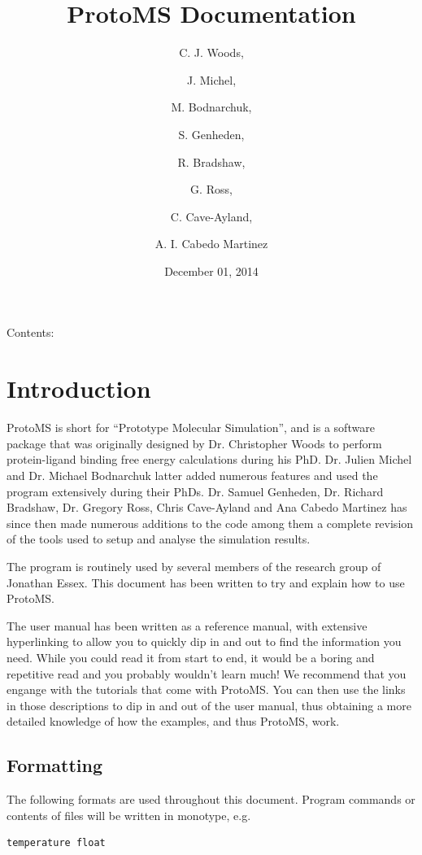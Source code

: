 \documentclass[letterpaper,10pt,english]{sphinxmanual}
\title{ProtoMS Documentation}
\date{December 01, 2014}
\author{C. J. Woods, \and J. Michel, \and M. Bodnarchuk, \and S. Genheden, \and R. Bradshaw, \and G. Ross, \and C. Cave-Ayland, \and A. I. Cabedo Martinez}
\begin{document}
\maketitle
\tableofcontents
{}\label{index::doc}


Contents:


\chapter{Introduction}
\label{introduction:introduction}\label{introduction:protoms-documentation}\label{introduction::doc}
ProtoMS is short for “Prototype Molecular Simulation”, and is a software package that was originally designed by Dr. Christopher Woods to perform protein-ligand binding free energy calculations during his PhD. Dr. Julien Michel and Dr. Michael Bodnarchuk latter added numerous features and used the program extensively during their PhDs. Dr. Samuel Genheden, Dr. Richard Bradshaw, Dr. Gregory Ross, Chris Cave-Ayland and Ana Cabedo Martinez has since then made numerous additions to the code among them a complete revision of the tools used to setup and analyse the simulation results.

The program is routinely used by several members of the research group of Jonathan Essex. This document has been written to try and explain how to use ProtoMS.

The user manual has been written as a reference manual, with extensive hyperlinking to allow you to quickly dip in and out to find the information you need. While you could read it from start to end, it would be a boring and repetitive read and you probably wouldn’t learn much! We recommend that you engange with the tutorials that come with ProtoMS. You can then use the links in those descriptions to dip in and out of the user manual, thus obtaining a more detailed knowledge of how the examples, and thus ProtoMS, work.


\section{Formatting}
\label{introduction:formatting}
The following formats are used throughout this document. Program commands or contents of files will be written in monotype, e.g.

\begin{Verbatim}[frame=single,commandchars=\\\{\}]
temperature float
\end{Verbatim}
\end{document}
